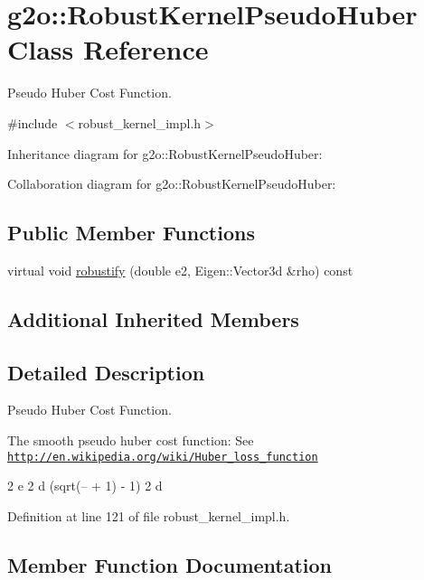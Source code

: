 \hypertarget{classg2o_1_1RobustKernelPseudoHuber}{}\section{g2o\+:\+:Robust\+Kernel\+Pseudo\+Huber Class Reference}
\label{classg2o_1_1RobustKernelPseudoHuber}


Pseudo Huber Cost Function.  




{\ttfamily \#include $<$robust\+\_\+kernel\+\_\+impl.\+h$>$}



Inheritance diagram for g2o\+:\+:Robust\+Kernel\+Pseudo\+Huber\+:


Collaboration diagram for g2o\+:\+:Robust\+Kernel\+Pseudo\+Huber\+:
\subsection*{Public Member Functions}
\begin{DoxyCompactItemize}
\item 
virtual void \hyperlink{classg2o_1_1RobustKernelPseudoHuber_a297dce8c836d499bd4c2818628574933}{robustify} (double e2, Eigen\+::\+Vector3d \&rho) const 
\end{DoxyCompactItemize}
\subsection*{Additional Inherited Members}


\subsection{Detailed Description}
Pseudo Huber Cost Function. 

The smooth pseudo huber cost function\+: See \href{http://en.wikipedia.org/wiki/Huber_loss_function}{\tt http\+://en.\+wikipedia.\+org/wiki/\+Huber\+\_\+loss\+\_\+function}

2 e 2 d (sqrt(-- + 1) -\/ 1) 2 d 

Definition at line 121 of file robust\+\_\+kernel\+\_\+impl.\+h.



\subsection{Member Function Documentation}
